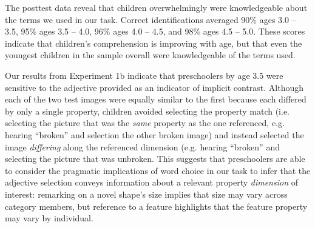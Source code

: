 \documentclass[10pt,letterpaper]{article}
\begin{document}

The posttest data reveal that children overwhelmingly were  knowledgeable about the terms we used in our task.  Correct identifications averaged 90\% ages 3.0 -- 3.5, 95\% ages 3.5 -- 4.0, 96\% ages 4.0 -- 4.5, and 98\% ages 4.5 -- 5.0.  These scores indicate that children's comprehension is improving with age, but that even the youngest children in the sample overall were knowledgeable of the terms used. 





Our results from Experiment 1b indicate that preschoolers by age 3.5 were sensitive to the adjective provided as an indicator of implicit contrast.  Although each of the two test images were equally similar to the first because each differed by only a single property, children avoided selecting the property match (i.e. selecting the picture that was the \emph{same} property as the one referenced, e.g. hearing ``broken'' and selection the other broken image) and instead selected the image \emph{differing} along the referenced dimension (e.g. hearing ``broken'' and selecting the picture that was unbroken. This suggests that preschoolers are able to consider the pragmatic implications of word choice in our task to infer that the adjective selection conveys information about a relevant property \emph{dimension} of interest: remarking on a novel shape's size implies that size may vary across category members, but reference to a feature highlights that the feature property may vary by individual.  
\end{document}
